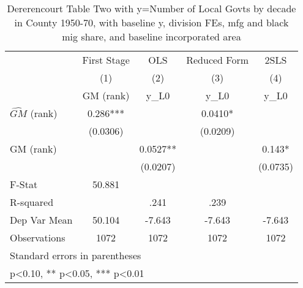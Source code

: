 \begin{table}[htbp]\centering
\def\sym#1{\ifmmode^{#1}\else\(^{#1}\)\fi}
\caption{Dererencourt Table Two with y=Number of Local Govts by decade in County 1950-70, with baseline y, division FEs, mfg and black mig share, and baseline incorporated area}
\begin{tabular}{l*{4}{c}}
\toprule
                    & First Stage   &         OLS   &Reduced Form   &        2SLS   \\
                    &\multicolumn{1}{c}{(1)}&\multicolumn{1}{c}{(2)}&\multicolumn{1}{c}{(3)}&\multicolumn{1}{c}{(4)}\\
                    &\multicolumn{1}{c}{GM  (rank)}&\multicolumn{1}{c}{y\_L0}&\multicolumn{1}{c}{y\_L0}&\multicolumn{1}{c}{y\_L0}\\
\midrule
$\hat{GM}$ (rank)   &       0.286***&               &      0.0410*  &               \\
                    &    (0.0306)   &               &    (0.0209)   &               \\
\addlinespace
GM  (rank)          &               &      0.0527** &               &       0.143*  \\
                    &               &    (0.0207)   &               &    (0.0735)   \\
\midrule
F-Stat              &      50.881   &               &               &               \\
R-squared           &               &        .241   &        .239   &               \\
Dep Var Mean        &      50.104   &      -7.643   &      -7.643   &      -7.643   \\
Observations        &        1072   &        1072   &        1072   &        1072   \\
\bottomrule
\multicolumn{5}{l}{\footnotesize Standard errors in parentheses}\\
\multicolumn{5}{l}{\footnotesize * p<0.10, ** p<0.05, *** p<0.01}\\
\end{tabular}
\end{table}
